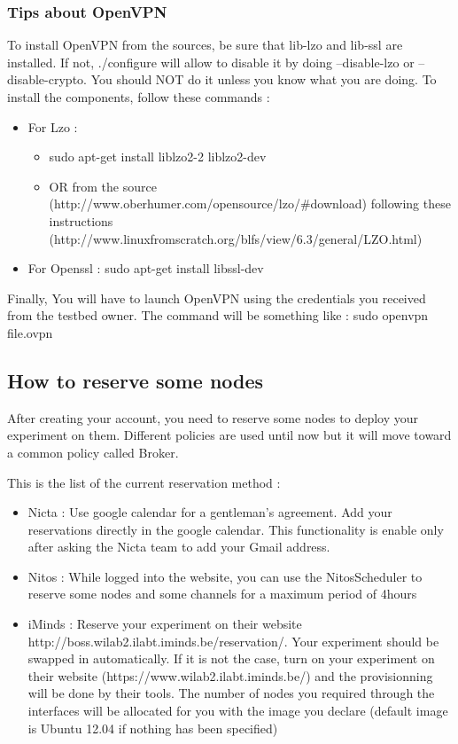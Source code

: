 \subsubsection{Tips about OpenVPN}

To install OpenVPN from the sources, be sure that lib-lzo and lib-ssl are installed. If not, ./configure will allow to disable it by doing --disable-lzo or --disable-crypto. You should NOT do it unless you know what you are doing.
To install the components, follow these commands :
\begin{itemize}
\item For Lzo : 
\begin{itemize}
\item sudo apt-get install liblzo2-2 liblzo2-dev 
\item OR from the ​source (http://www.oberhumer.com/opensource/lzo/\#download) following these instructions 
(http://www.linuxfromscratch.org/blfs/view/6.3/general/LZO.html)
\end{itemize}
\item For Openssl : sudo apt-get install libssl-dev 
\end{itemize}
Finally, You will have to launch OpenVPN using the credentials you received from the testbed owner. The command will be something like :
sudo openvpn file.ovpn

\subsection{How to reserve some nodes}

After creating your account, you need to reserve some nodes to deploy your experiment on them. Different policies are used until now but it will move toward a common policy called Broker. 

This is the list of the current reservation method :
\begin{itemize}
\item Nicta : Use google calendar for a gentleman's agreement. Add your reservations directly in the google calendar. This functionality is enable only after asking the Nicta team to add your Gmail address.
\item Nitos : While logged into the website, you can use the Nitos ​Scheduler to reserve some nodes and some channels for a maximum period of 4hours
\item iMinds : Reserve your experiment on their website 
http://boss.wilab2.ilabt.iminds.be/reservation/. Your experiment should be swapped in automatically. If it is not the case, turn on your experiment on their website 
(https://www.wilab2.ilabt.iminds.be/) and the provisionning will be done by their tools. The number of nodes you required through the interfaces will be allocated for you with the image you declare (default image is Ubuntu 12.04 if nothing has been specified)
\end{itemize}


